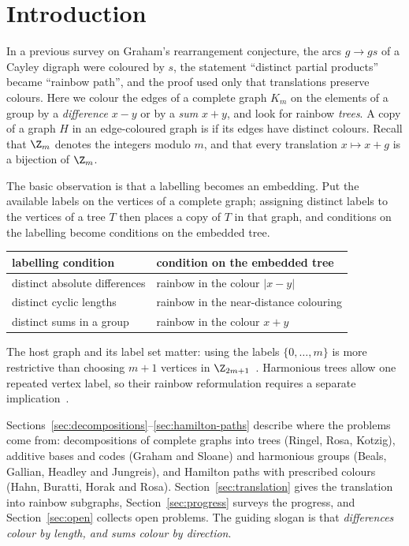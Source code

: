 \section{Introduction}\label{sec:intro}

In a previous survey on Graham's rearrangement conjecture, the arcs $g\to gs$ of a Cayley digraph were coloured by $s$, the statement ``distinct partial products'' became ``rainbow path'', and the proof used only that translations preserve colours. Here we colour the edges of a complete graph $K_m$ on the elements of a group by a \emph{difference} $x-y$ or by a \emph{sum} $x+y$, and look for rainbow \emph{trees}. A copy of a graph $H$ in an edge-coloured graph is  if its edges have distinct colours. Recall that $\Z_m$ denotes the integers modulo $m$, and that every translation $x\mapsto x+g$ is a bijection of $\Z_m$.

The basic observation is that a labelling becomes an embedding. Put the available labels on the vertices of a complete graph; assigning distinct labels to the vertices of a tree $T$ then places a copy of $T$ in that graph, and conditions on the labelling become conditions on the embedded tree.

\begin{center}
\renewcommand{\arraystretch}{1.35}
\begin{tabular}{ll}
\textbf{labelling condition} & \textbf{condition on the embedded tree}\\\hline
distinct absolute differences & rainbow in the colour $|x-y|$\\
distinct cyclic lengths & rainbow in the near-distance colouring\\
distinct sums in a group & rainbow in the colour $x+y$
\end{tabular}
\end{center}

The host graph and its label set matter: using the labels $\{0,\dots,m\}$ is more restrictive than choosing $m+1$ vertices in $\Z_{2m+1}$~\cite[\S1]{mps20}. Harmonious trees allow one repeated vertex label, so their rainbow reformulation requires a separate implication~\cite[\S1]{mp25b}.

Sections~\ref{sec:decompositions}--\ref{sec:hamilton-paths} describe where the problems come from: decompositions of complete graphs into trees (Ringel, Rosa, Kotzig), additive bases and codes (Graham and Sloane) and harmonious groups (Beals, Gallian, Headley and Jungreis), and Hamilton paths with prescribed colours (Hahn, Buratti, Horak and Rosa). Section~\ref{sec:translation} gives the translation into rainbow subgraphs, Section~\ref{sec:progress} surveys the progress, and Section~\ref{sec:open} collects open problems. The guiding slogan is that \emph{differences colour by length, and sums colour by direction}.
